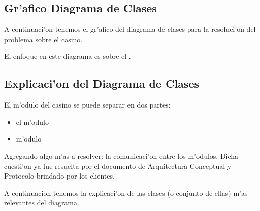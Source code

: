 \subsection{Gr'afico Diagrama de Clases}

A continuaci'on tenemos el gr'afico del diagrama de clases para la resoluci'on del problema sobre el casino.

El enfoque en este diagrama es sobre el .

\clearpage

\subsection{Explicaci'on del Diagrama de Clases}

El m'odulo del casino se puede separar en dos partes: 

\begin{itemize}
\item el m'odulo  
\item m'odulo 
\end{itemize}  

Agregando algo m'as a resolver: la comunicaci'on entre los m'odulos. Dicha cuesti'on ya fue resuelta por el documento de Arquitectura Conceptual y Protocolo brindado por los clientes.

A continuacion tenemos la explicaci'on de las clases (o conjunto de ellas) m'as relevantes del diagrama.

